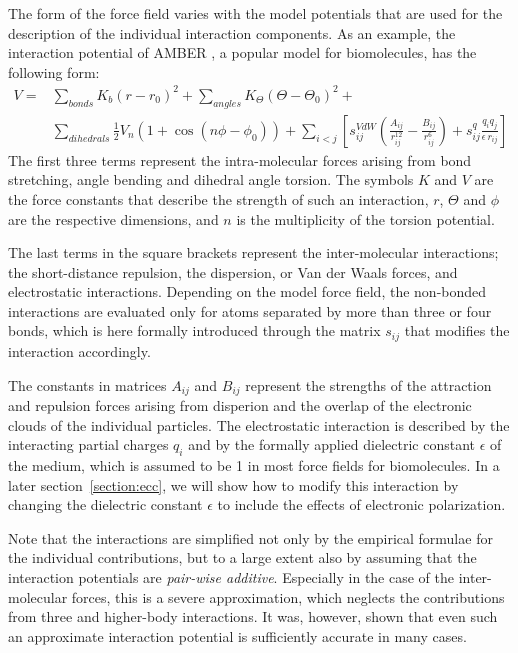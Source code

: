 The form of the force field varies with the model potentials that are used for the description of the individual interaction components. 
As an example, the interaction potential of AMBER \citep{ferrer13}, a popular model for biomolecules, has the following form:
\begin{eqnarray}  \label{eq:amber}
  V = & \displaystyle \sum _{bonds} K_b (r-r_{0})^2 + \sum _{angles} K_\Theta (\Theta-\Theta_{0})^2 + \\ \nonumber
      & \displaystyle \sum _{dihedrals} \frac{1}{2} V_n (1+\cos(n\phi -\phi_0)) + \sum _{i<j} \left [ s_{ij} ^{VdW} \left( \frac{A_{ij}}{r_{ij} ^{12}} - \frac{B_{ij}}{r_{ij} ^6} \right ) + s_{ij}^q \frac{q_i q_j}{\epsilon \, r_{ij}} \right ]
\end{eqnarray}
The first three terms represent the intra-molecular forces arising from bond stretching, angle bending and dihedral angle torsion. 
The symbols $K$ and $V$ are the force constants that describe the strength of such an interaction,
$r$, $\Theta$ and $\phi$ are the respective dimensions,
and $n$ is the multiplicity of the torsion potential. 

The last terms in the square brackets represent the inter-molecular interactions; 
the short-distance repulsion, the dispersion, or Van der Waals forces, and electrostatic interactions. 
Depending on the model force field, the non-bonded interactions are evaluated only for atoms separated by more than three or four bonds, 
which is here formally introduced through the matrix $s_{ij}$ that modifies the interaction accordingly.

The constants in matrices $A_{ij}$ and $B_{ij}$ represent the strengths of the attraction and repulsion forces 
arising from disperion and the overlap of the electronic clouds of the individual particles.  
The electrostatic interaction is described by the interacting partial charges $q_i$ and by the formally applied dielectric constant $\epsilon$ of the medium, 
which is assumed to be 1 in most force fields for biomolecules. 
In a later section~\ref{section:ecc}, we will show how to modify this interaction 
by changing the dielectric constant $\epsilon$ to include the effects of electronic polarization. 

Note that the interactions are simplified not only by the empirical formulae for the individual contributions, 
but to a large extent also by assuming that the interaction potentials are \emph{pair-wise additive}. 
Especially in the case of the inter-molecular forces, this is a severe approximation, 
which neglects the contributions from three and higher-body interactions. 
It was, however, shown that even such an approximate interaction potential is sufficiently accurate in many cases. \citep{}  

